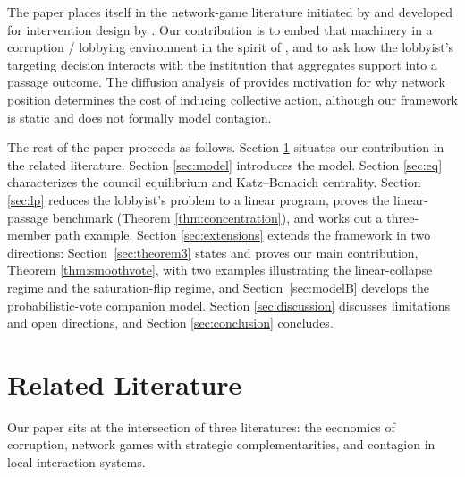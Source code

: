 \documentclass[11pt,letterpaper]{article}
\theoremstyle{plain}
\theoremstyle{definition}
\theoremstyle{remark}
\begin{document}
The paper places itself in the network-game literature initiated by \citet{bcz2006} and developed for intervention design by \citet{ggg2020}. Our contribution is to embed that machinery in a corruption / lobbying environment in the spirit of \citet{shleifer1993}, and to ask how the lobbyist's targeting decision interacts with the institution that aggregates support into a passage outcome. The diffusion analysis of \citet{morris2000} provides motivation for why network position determines the cost of inducing collective action, although our framework is static and does not formally model contagion.

The rest of the paper proceeds as follows. Section \ref{sec:related} situates our contribution in the related literature. Section \ref{sec:model} introduces the model. Section \ref{sec:eq} characterizes the council equilibrium and Katz--Bonacich centrality. Section \ref{sec:lp} reduces the lobbyist's problem to a linear program, proves the linear-passage benchmark (Theorem \ref{thm:concentration}), and works out a three-member path example. Section \ref{sec:extensions} extends the framework in two directions: Section~\ref{sec:theorem3} states and proves our main contribution, Theorem \ref{thm:smoothvote}, with two examples illustrating the linear-collapse regime and the saturation-flip regime, and Section~\ref{sec:modelB} develops the probabilistic-vote companion model. Section \ref{sec:discussion} discusses limitations and open directions, and Section \ref{sec:conclusion} concludes.


\section{Related Literature}
\label{sec:related}

Our paper sits at the intersection of three literatures: the economics of corruption, network games with strategic complementarities, and contagion in local interaction systems.
\end{document}
